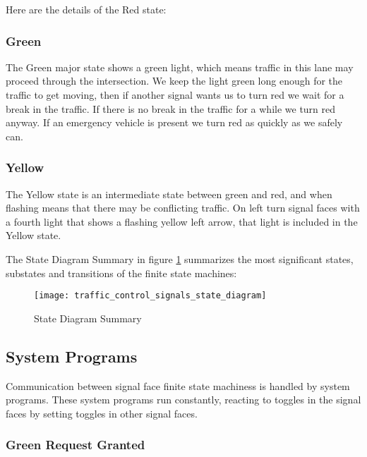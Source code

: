 \documentclass[letterpaper,twoside]{article}
\begin{document}
Here are the details of the Red state:
      


\subsubsection{Green}
The Green major state shows a green light, which means traffic in this lane
may proceed through the intersection.  We keep the light green long enough
for the traffic to get moving, then if another signal wants us to turn
red we wait for a break in the traffic.  If there is no break in the
traffic for a while we turn red anyway.  If an emergency vehicle is present
we turn red as quickly as we safely can.



\subsubsection{Yellow}
The Yellow state is an intermediate state between green and red, and when
flashing means that there may be conflicting traffic.  On left turn signal
faces with a fourth light that shows a flashing yellow left arrow, that
light is included in the Yellow state.



The State Diagram Summary in figure \ref{fig:State_Diagram_Summary}
summarizes the most significant states, substates and
transitions of the finite state machines:

\begin{figure}[htb]
  {\texttt{[image: traffic\_control\_signals\_state\_diagram]}}
  {\caption{State Diagram Summary}\label{fig:State_Diagram_Summary}}
\end{figure}

\subsection{System Programs}

Communication between signal face finite state machiness is handled by
system programs.
These system programs run constantly, reacting to toggles in the
signal faces by setting toggles in other signal faces.

\subsubsection{Green Request Granted}
\end{document}
